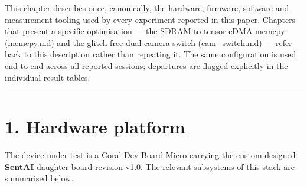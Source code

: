 This chapter describes once, canonically, the hardware, firmware,
software and measurement tooling used by every experiment reported in
this paper. Chapters that present a specific optimisation --- the
SDRAM-to-tensor eDMA memcpy (\url{memcpy.md}) and the glitch-free
dual-camera switch (\url{cam_switch.md}) --- refer back to this
description rather than repeating it. The same configuration is used
end-to-end across all reported sessions; departures are flagged
explicitly in the individual result tables.

\begin{center}\rule{0.5\linewidth}{0.5pt}\end{center}

\section{1. Hardware platform}\label{hardware-platform}

The device under test is a Coral Dev Board Micro carrying the
custom-designed \textbf{SentAI} daughter-board revision v1.0. The
relevant subsystems of this stack are summarised below.


